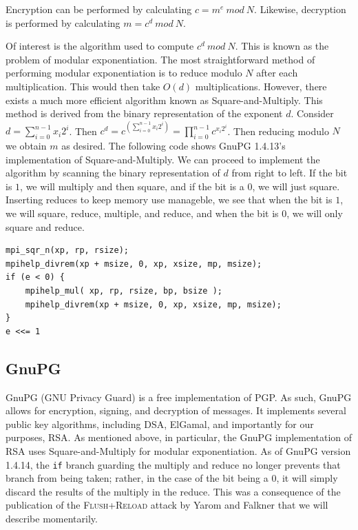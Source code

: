 \documentclass[11pt]{llncs}
\newcommand{\flushreload}{\textsc{Flush}+\textsc{Reload}}
\begin{document}
Encryption can be performed by calculating $c = m^e\ mod\ N$. Likewise,
decryption is performed by calculating $m = c^d\ mod\ N$.

Of interest is the algorithm used to compute $c^d\ mod\ N$. This is known as the
problem of modular exponentiation. The most straightforward method of performing
modular exponentiation is to reduce modulo $N$ after each multiplication. This
would then take $O(d)$ multiplications. However, there exists a much more
efficient algorithm known as Square-and-Multiply\cite{Knuth:1997:ACP:270146}.
This method is derived from the binary representation of the exponent $d$.
Consider $d = \sum_{i=0}^{n-1}x_i 2^i$. Then $c^d = c^{(\sum_{i=0}^{n-1}x_i
2^i)} = \prod_{i=0}^{n-1}c^{x_i 2^i}$. Then reducing modulo $N$ we obtain
$m$ as desired. The following code shows GnuPG 1.4.13's implementation of
Square-and-Multiply. We can proceed to implement the algorithm by scanning the
binary representation of $d$ from right to left. If the bit is $1$, we will
multiply and then square, and if the bit is a $0$, we will just square.
Inserting reduces to keep memory use manageble, we see that when the bit is $1$,
we will square, reduce, multiple, and reduce, and when the bit is $0$, we will
only square and reduce.

\begin{lstlisting}[caption={GnuPG 1.4.13's implementation of Square-and-Multiply
    (excerpted)}]
mpi_sqr_n(xp, rp, rsize);
mpihelp_divrem(xp + msize, 0, xp, xsize, mp, msize);
if (e < 0) {
    mpihelp_mul( xp, rp, rsize, bp, bsize );
    mpihelp_divrem(xp + msize, 0, xp, xsize, mp, msize);
}
e <<= 1
\end{lstlisting}

\subsection{GnuPG}

GnuPG (GNU Privacy Guard) is a free implementation of PGP. As such, GnuPG allows
for encryption, signing, and decryption of messages. It implements several
public key algorithms, including DSA, ElGamal, and importantly for our purposes,
RSA. As mentioned above, in particular, the GnuPG implementation of RSA uses
Square-and-Multiply for modular exponentiation. As of GnuPG version 1.4.14, the
\texttt{if} branch guarding the multiply and reduce no longer prevents that branch from
being taken; rather, in the case of the bit being a $0$, it will simply discard
the results of the multiply in the reduce. This was a consequence of the
publication of the \flushreload{} attack by Yarom and Falkner\cite{YF13} that we
will describe momentarily.
\end{document}

